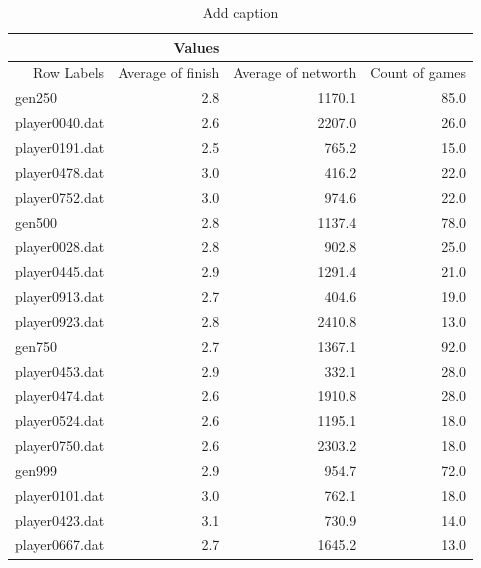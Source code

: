       \begin{table}[htbp]
        \centering
        \caption{Add caption}
          \begin{tabular}{rrrr}
          \toprule
                 & Values &        &  \\
          \midrule
          Row Labels & Average of finish & Average of networth & Count of games \\
          \multicolumn{1}{l}{gen250} & 2.8    & 1170.1 & 85.0 \\
          \hline
          \multicolumn{1}{l}{player0040.dat} & 2.6    & 2207.0 & 26.0 \\
          \multicolumn{1}{l}{player0191.dat} & 2.5    & 765.2  & 15.0 \\
          \multicolumn{1}{l}{player0478.dat} & 3.0    & 416.2  & 22.0 \\
          \multicolumn{1}{l}{player0752.dat} & 3.0    & 974.6  & 22.0 \\
          \multicolumn{1}{l}{gen500} & 2.8    & 1137.4 & 78.0 \\
          \hline
          \multicolumn{1}{l}{player0028.dat} & 2.8    & 902.8  & 25.0 \\
          \multicolumn{1}{l}{player0445.dat} & 2.9    & 1291.4 & 21.0 \\
          \multicolumn{1}{l}{player0913.dat} & 2.7    & 404.6  & 19.0 \\
          \multicolumn{1}{l}{player0923.dat} & 2.8    & 2410.8 & 13.0 \\
          \multicolumn{1}{l}{gen750} & 2.7    & 1367.1 & 92.0 \\
          \hline
          \multicolumn{1}{l}{player0453.dat} & 2.9    & 332.1  & 28.0 \\
          \multicolumn{1}{l}{player0474.dat} & 2.6    & 1910.8 & 28.0 \\
          \multicolumn{1}{l}{player0524.dat} & 2.6    & 1195.1 & 18.0 \\
          \multicolumn{1}{l}{player0750.dat} & 2.6    & 2303.2 & 18.0 \\
          \multicolumn{1}{l}{gen999} & 2.9    & 954.7  & 72.0 \\
          \hline
          \multicolumn{1}{l}{player0101.dat} & 3.0    & 762.1  & 18.0 \\
          \multicolumn{1}{l}{player0423.dat} & 3.1    & 730.9  & 14.0 \\
          \multicolumn{1}{l}{player0667.dat} & 2.7    & 1645.2 & 13.0 \\

\end{tabular}
\end{table}
